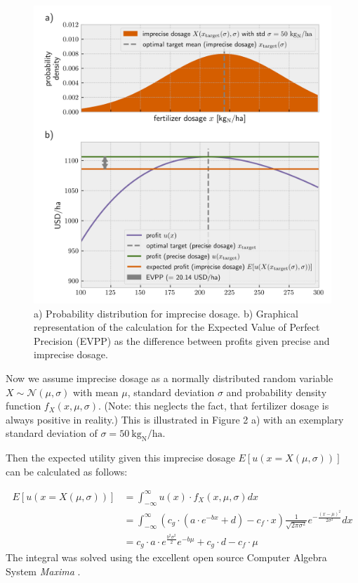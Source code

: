 \begin{figure}
\centering
\includegraphics{imgs/synplot2.png}
\caption{a) Probability distribution for imprecise dosage. b) Graphical representation of the calculation for the Expected Value of Perfect Precision (EVPP) as the difference between profits given precise and imprecise dosage.}
\end{figure}

Now we assume imprecise dosage as a normally distributed random variable $X \sim \mathcal{N}(\mu, \sigma)$ with mean $\mu$, standard deviation $\sigma$ and probability density function $f_X(x, \mu, \sigma)$. (Note: this neglects the fact, that fertilizer dosage is always positive in reality.) This is illustrated in Figure 2 a) with an exemplary standard deviation of $\sigma = 50 \ \text{kg}_\text{N} / \text{ha}$.

Then the expected utility given this imprecise dosage $E[u(x=X(\mu, \sigma))]$ can be calculated as follows:

\begin{align}
    E[u(x=X(\mu, \sigma))] &= \int_{-\infty}^\infty u(x)\cdot f_X(x, \mu, \sigma) dx \\
    &= \int_{-\infty}^\infty (c_g \cdot (a \cdot e^{-bx} +d) - c_f \cdot x) \frac{1}{\sqrt{2\pi\sigma^2} } e^{-\frac{(x-\mu)^2}{2\sigma^2}} dx\\
    &= c_g \cdot a \cdot e^{\frac{b^2 \sigma^2}{2}} e^{-b \mu} + c_g \cdot d - c_f \cdot \mu
\end{align} The integral was solved using the excellent open source Computer Algebra System \emph{Maxima} \citep{maxima}.


